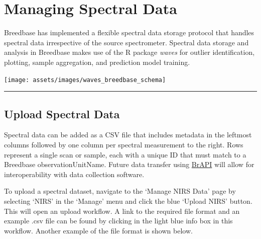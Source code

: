 \documentclass[
  12pt,
]{book}
\begin{document}
\hypertarget{managing-spectral-data}{%
\chapter{Managing Spectral Data}\label{managing-spectral-data}}

Breedbase has implemented a flexible spectral data storage protocol that handles spectral data irrespective of the source spectrometer. Spectral data storage and analysis in Breedbase makes use of the R package \emph{waves} for outlier identification, plotting, sample aggregation, and prediction model training.

\begin{center}\texttt{[image: assets/images/waves\_breedbase\_schema]} \end{center}

\begin{center}\rule{0.5\linewidth}{0.5pt}\end{center}

\hypertarget{upload-spectral-data}{%
\section{Upload Spectral Data}\label{upload-spectral-data}}

Spectral data can be added as a CSV file that includes metadata in the leftmost columns followed by one column per spectral measurement to the right. Rows represent a single scan or sample, each with a unique ID that must match to a Breedbase observationUnitName. Future data transfer using \href{https://brapi.org}{BrAPI} will allow for interoperability with data collection software.

To upload a spectral dataset, navigate to the `Manage NIRS Data' page by selecting `NIRS' in the `Manage' menu and click the blue `Upload NIRS' button. This will open an upload workflow. A link to the required file format and an example .csv file can be found by clicking in the light blue info box in this workflow. Another example of the file format is shown below.
\end{document}
